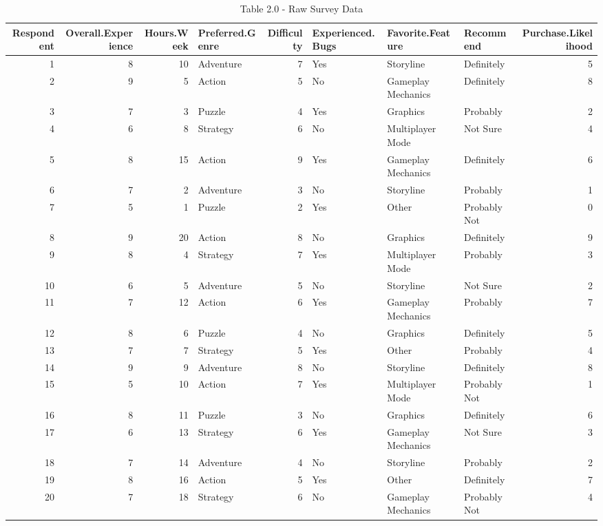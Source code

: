 \documentclass[
  letterpaper,
  DIV=11,
  numbers=noendperiod]{scrartcl}
\begin{document}
\begin{table}

\caption{\label{tab:survey data}Table 2.0 - Raw Survey Data}
\centering
\begin{tabular}[t]{r|r|r|l|r|l|l|l|r}
\hline
Respondent & Overall.Experience & Hours.Week & Preferred.Genre & Difficulty & Experienced.Bugs & Favorite.Feature & Recommend & Purchase.Likelihood\\
\hline
1 & 8 & 10 & Adventure & 7 & Yes & Storyline & Definitely & 5\\
\hline
2 & 9 & 5 & Action & 5 & No & Gameplay Mechanics & Definitely & 8\\
\hline
3 & 7 & 3 & Puzzle & 4 & Yes & Graphics & Probably & 2\\
\hline
4 & 6 & 8 & Strategy & 6 & No & Multiplayer Mode & Not Sure & 4\\
\hline
5 & 8 & 15 & Action & 9 & Yes & Gameplay Mechanics & Definitely & 6\\
\hline
6 & 7 & 2 & Adventure & 3 & No & Storyline & Probably & 1\\
\hline
7 & 5 & 1 & Puzzle & 2 & Yes & Other & Probably Not & 0\\
\hline
8 & 9 & 20 & Action & 8 & No & Graphics & Definitely & 9\\
\hline
9 & 8 & 4 & Strategy & 7 & Yes & Multiplayer Mode & Probably & 3\\
\hline
10 & 6 & 5 & Adventure & 5 & No & Storyline & Not Sure & 2\\
\hline
11 & 7 & 12 & Action & 6 & Yes & Gameplay Mechanics & Probably & 7\\
\hline
12 & 8 & 6 & Puzzle & 4 & No & Graphics & Definitely & 5\\
\hline
13 & 7 & 7 & Strategy & 5 & Yes & Other & Probably & 4\\
\hline
14 & 9 & 9 & Adventure & 8 & No & Storyline & Definitely & 8\\
\hline
15 & 5 & 10 & Action & 7 & Yes & Multiplayer Mode & Probably Not & 1\\
\hline
16 & 8 & 11 & Puzzle & 3 & No & Graphics & Definitely & 6\\
\hline
17 & 6 & 13 & Strategy & 6 & Yes & Gameplay Mechanics & Not Sure & 3\\
\hline
18 & 7 & 14 & Adventure & 4 & No & Storyline & Probably & 2\\
\hline
19 & 8 & 16 & Action & 5 & Yes & Other & Definitely & 7\\
\hline
20 & 7 & 18 & Strategy & 6 & No & Gameplay Mechanics & Probably Not & 4\\
\hline
\end{tabular}
\end{table}
\end{document}
